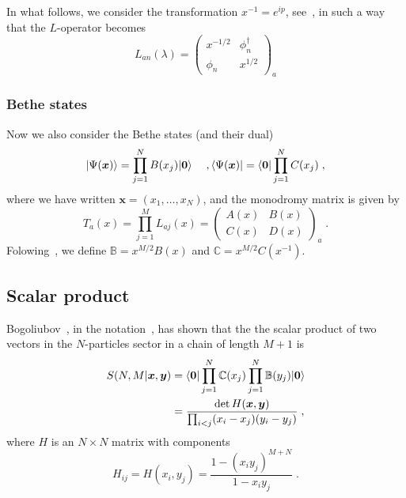 \documentclass[a4paper,11pt]{amsart}
\begin{document}
In what follows, we consider the transformation \(x^{-1} = e^{ip}\), see~\cite{Wheeler:2010vmq},
in such a way that the \(L\)-operator becomes
\begin{equation}
  L_{an}(\lambda) =
  \begin{pmatrix}
    x^{-1/2} & \phi_n^\dagger \\ \phi_n & x^{1/2} 
  \end{pmatrix}_a
\end{equation}


\subsubsection{Bethe states} 

Now we also consider the Bethe states (and their dual) 
\begin{equation}
\lvert\Psi(\bm{x})\rangle = \prod_{j=1}^N B(x_j) \lvert\bm{0}\rangle\quad \; ,
\langle\Psi(\bm{x})\rvert = \langle\bm{0}\rvert\prod_{j=1}^N C(x_j) \; ,
\end{equation}
where we have written \(\bm{x} = (x_1, \dots, x_N)\), and the monodromy matrix
is given by
\begin{equation}
  T_a(x) = \prod_{j=1}^M L_{a j}(x) = 
  \begin{pmatrix}
    A(x) & B(x) \\
    C(x) & D(x)
  \end{pmatrix}_a \; .
\end{equation}
Folowing~\cite{Wheeler:2010vmq}, we define \(\mathbb{B} = x^{M/2} B(x)\) and 
\(\mathbb{C} = x^{M/2} C(x^{-1})\). 


\subsection{Scalar product}

Bogoliubov~\cite{Bogoliubov2005}, in the notation~\cite{Wheeler:2010vmq},
has shown that the the scalar product of two vectors in the
\(N\)-particles sector in a chain of length \(M + 1\) is
\begin{equation}
\begin{split}
\label{eq:scalar}
  S(N, M|\bm{x}, \bm{y}) & =
  \langle\bm{0}\rvert \prod_{j=1}^N \mathbb{C}(x_j) \prod_{j=1}^N \mathbb{B}(y_j) \lvert\bm{0}\rangle \\ 
 & = \frac{ \det H(\bm{x},\bm{y})}{ \prod_{i<j}(x_i - x_j)(y_i - y_j)} \; ,
\end{split}
\end{equation}
where \(H\) is an \(N\times N\) matrix with components
\begin{equation}
  H_{ij} = H(x_i, y_j) 
  =\frac{1 - (x_i y_j)^{ M + N}}{1 - x_i y_j }\; .
\end{equation}
\end{document}
